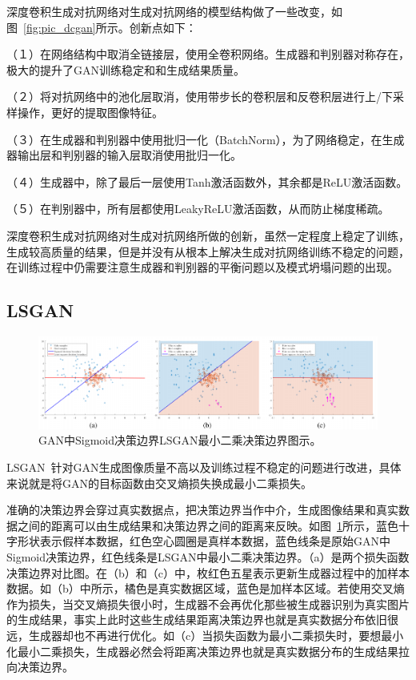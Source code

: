 深度卷积生成对抗网络对生成对抗网络的模型结构做了一些改变，如图~\ref{fig:pic_dcgan}所示。创新点如下：

（１）在网络结构中取消全链接层，使用全卷积网络。生成器和判别器对称存在，极大的提升了GAN训练稳定和和生成结果质量。

（２）将对抗网络中的池化层取消，使用带步长的卷积层和反卷积层进行上/下采样操作，更好的提取图像特征。

（３）在生成器和判别器中使用批归一化（BatchNorm），为了网络稳定，在生成器输出层和判别器的输入层取消使用批归一化。

（４）生成器中，除了最后一层使用Tanh激活函数外，其余都是ReLU激活函数。

（５）在判别器中，所有层都使用LeakyReLU激活函数，从而防止梯度稀疏。

深度卷积生成对抗网络对生成对抗网络所做的创新，虽然一定程度上稳定了训练，生成较高质量的结果，但是并没有从根本上解决生成对抗网络训练不稳定的问题，在训练过程中仍需要注意生成器和判别器的平衡问题以及模式坍塌问题的出现。

\subsection{LSGAN}
\begin{figure}[ht]
    \centering
	\includegraphics[width=\textwidth]{figures/lsgan.pdf}
	\caption{GAN中Sigmoid决策边界LSGAN最小二乘决策边界图示。}
	\label{fig:pic_lsgan}
\end{figure}

LSGAN~\cite{mao2017least}针对GAN生成图像质量不高以及训练过程不稳定的问题进行改进，具体来说就是将GAN的目标函数由交叉熵损失换成最小二乘损失。

准确的决策边界会穿过真实数据点，把决策边界当作中介，生成图像结果和真实数据之间的距离可以由生成结果和决策边界之间的距离来反映。如图~\ref{fig:pic_lsgan}所示，蓝色十字形状表示假样本数据，红色空心圆圈是真样本数据，蓝色线条是原始GAN中Sigmoid决策边界，红色线条是LSGAN中最小二乘决策边界。（a）是两个损失函数决策边界对比图。在（b）和（c）中，枚红色五星表示更新生成器过程中的加样本数据。如（b）中所示，橘色是真实数据区域，蓝色是加样本区域。若使用交叉熵作为损失，当交叉熵损失很小时，生成器不会再优化那些被生成器识别为真实图片的生成结果，事实上此时这些生成结果距离决策边界也就是真实数据分布依旧很远，生成器却也不再进行优化。如（c）当损失函数为最小二乘损失时，要想最小化最小二乘损失，生成器必然会将距离决策边界也就是真实数据分布的生成结果拉向决策边界。

